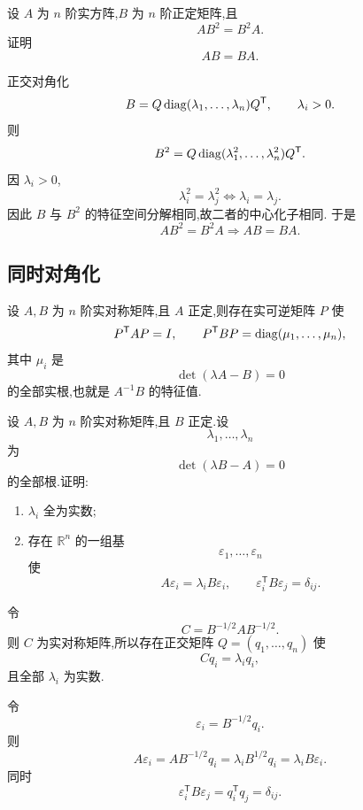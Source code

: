 \begin{example}
设 $A$ 为 $n$ 阶实方阵,$B$ 为 $n$ 阶正定矩阵,且
\[
AB^2=B^2A.
\]
证明
\[
AB=BA.
\]
\end{example}
\exampleblank

\begin{solution}
正交对角化
\[
B=Q\operatorname{diag}(\lambda_1,\ldots,\lambda_n)Q^{\mathsf T},
\qquad
\lambda_i>0.
\]
则
\[
B^2=Q\operatorname{diag}(\lambda_1^2,\ldots,\lambda_n^2)Q^{\mathsf T}.
\]
因 $\lambda_i>0$,
\[
\lambda_i^2=\lambda_j^2
\iff
\lambda_i=\lambda_j.
\]
因此 $B$ 与 $B^2$ 的特征空间分解相同,故二者的中心化子相同.
于是
\[
AB^2=B^2A
\Longrightarrow
AB=BA.
\]
\end{solution}


\subsection{同时对角化}

\begin{proposition}[\markstar]
设 $A,B$ 为 $n$ 阶实对称矩阵,且 $A$ 正定,则存在实可逆矩阵 $P$ 使
\[
P^{\mathsf T}AP=I,
\qquad
P^{\mathsf T}BP
=
\operatorname{diag}(\mu_1,\ldots,\mu_n),
\]
其中 $\mu_i$ 是
\[
\det(\lambda A-B)=0
\]
的全部实根,也就是 $A^{-1}B$ 的特征值.
\end{proposition}


\begin{example}
设 $A,B$ 为 $n$ 阶实对称矩阵,且 $B$ 正定.设
\[
\lambda_1,\ldots,\lambda_n
\]
为
\[
\det(\lambda B-A)=0
\]
的全部根.证明:
\begin{enumerate}
    \item $\lambda_i$ 全为实数;
    \item 存在 $\mathbb{R}^n$ 的一组基
    \[
    \varepsilon_1,\ldots,\varepsilon_n
    \]
    使
    \[
    A\varepsilon_i=\lambda_iB\varepsilon_i,
    \qquad
    \varepsilon_i^{\mathsf T}B\varepsilon_j=\delta_{ij}.
    \]
\end{enumerate}
\end{example}
\exampleblank

\begin{solution}
令
\[
C=B^{-1/2}AB^{-1/2}.
\]
则 $C$ 为实对称矩阵,所以存在正交矩阵 $Q=(q_1,\ldots,q_n)$ 使
\[
Cq_i=\lambda_iq_i,
\]
且全部 $\lambda_i$ 为实数.

令
\[
\varepsilon_i=B^{-1/2}q_i.
\]
则
\[
A\varepsilon_i
=
AB^{-1/2}q_i
=
\lambda_iB^{1/2}q_i
=
\lambda_iB\varepsilon_i.
\]
同时
\[
\varepsilon_i^{\mathsf T}B\varepsilon_j
=
q_i^{\mathsf T}q_j
=
\delta_{ij}.
\]
\end{solution}


